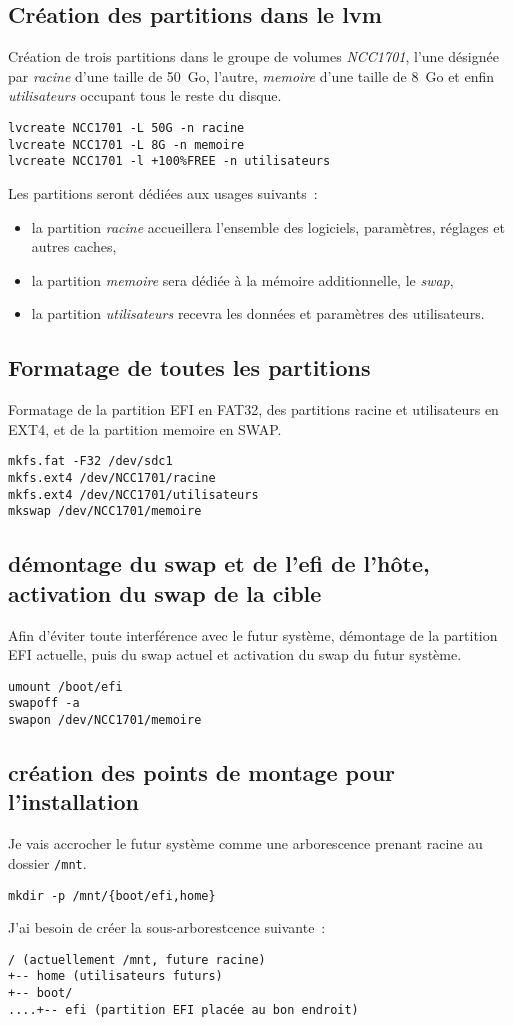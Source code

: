 \documentclass[12pt, a4paper]{article}
\begin{document}
\subsection{Création des partitions dans le lvm}
Création de trois partitions dans le groupe de volumes \emph{NCC1701\/}, l'une désignée par \emph{racine\/} d'une taille de 50~Go, l'autre, \emph{memoire\/} d'une taille de 8~Go et enfin \emph{utilisateurs\/} occupant tous le reste du disque.
\begin{verbatim}
lvcreate NCC1701 -L 50G -n racine
lvcreate NCC1701 -L 8G -n memoire
lvcreate NCC1701 -l +100%FREE -n utilisateurs
\end{verbatim}
Les partitions seront dédiées aux usages suivants~:
\begin{itemize}
	\item la partition \emph{racine\/} accueillera l'ensemble des logiciels, paramètres, réglages et autres caches,
	\item la partition \emph{memoire\/} sera dédiée à la mémoire additionnelle, le \emph{swap\/},
	\item la partition \emph{utilisateurs\/} recevra les données et paramètres des utilisateurs.
\end{itemize}

\subsection{Formatage de toutes les partitions}
Formatage de la partition EFI en FAT32, des partitions racine et utilisateurs en EXT4, et de la partition memoire en SWAP.
\begin{verbatim}
mkfs.fat -F32 /dev/sdc1
mkfs.ext4 /dev/NCC1701/racine
mkfs.ext4 /dev/NCC1701/utilisateurs
mkswap /dev/NCC1701/memoire
\end{verbatim}

\subsection{démontage du swap et de l'efi de l'hôte, activation du swap de la cible}
Afin d'éviter toute interférence avec le futur système, démontage de la partition EFI actuelle, puis du swap actuel et activation du swap du futur système.
\begin{verbatim}
umount /boot/efi
swapoff -a
swapon /dev/NCC1701/memoire
\end{verbatim}

\subsection{création des points de montage pour l'installation}
Je vais accrocher le futur système comme une arborescence prenant racine au dossier \texttt{/mnt}.
\begin{verbatim}
mkdir -p /mnt/{boot/efi,home}
\end{verbatim}
J'ai besoin de créer la sous-arborestcence suivante~:
\begin{verbatim}
/ (actuellement /mnt, future racine)
+-- home (utilisateurs futurs)
+-- boot/
....+-- efi (partition EFI placée au bon endroit)
\end{verbatim}
\end{document}
